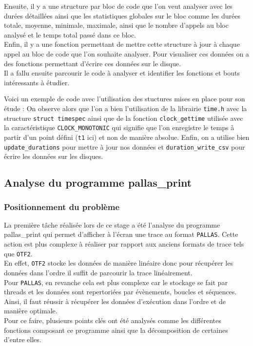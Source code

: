Ensuite, il y a une structure par bloc de code que l'on veut analyser avec les durées détaillées ainsi que les statistiques globales sur le bloc comme les durées totale, moyenne, minimale, maximale, ainsi que 
le nombre d'appels au bloc analysé et le temps total passé dans ce bloc.\\

Enfin, il y a une fonction permettant de mettre cette structure à jour à chaque appel au bloc de code que l'on souhaite analyser.\newline
Pour visualiser ces données on a des fonctions permettant d'écrire ces données sur le disque.\\

Il a fallu ensuite parcourir le code à analyser et identifier les fonctions et bouts intéressants à étudier.

Voici un exemple de code avec l'utilisation des stuctures mises en place pour son étude :
On observe alors que l'on a bien l'utilisation de la librairie \verb!time.h! avec la structure \verb!struct timespec! ainsi que de la fonction \verb!clock_gettime! utilisée
avec la caractéristique \verb!CLOCK_MONOTONIC! qui signifie que l'on enregistre le temps à partir d'un point défini (\verb!t1! ici) et non de manière absolue. Enfin, on a utilise bien
\verb!update_durations! pour mettre à jour nos données et \verb!duration_write_csv! pour écrire les données sur les disques.

\subsection{Analyse du programme pallas\_print}\label{ssec:pallas_print}
\subsubsection{Positionnement du problème}\label{ssec:pallas_print_pbm}

La première tâche réalisée lors de ce stage a été l'analyse du programme pallas\_print qui permet d'afficher à l'écran une trace au format \verb!PALLAS!.
Cette action est plus complexe à réaliser par rapport aux anciens formats de trace tels que \verb!OTF2!.\\
En effet, \verb!OTF2! stocke les données de manière linéaire donc pour récupérer les données dans l'ordre il suffit de parcourir la trace linéairement.\\
Pour \verb!PALLAS!, en revanche cela est plus complexe car le stockage se fait par threads et les données sont repertoriées par évènements, boucles et séquences. Ainsi, il faut réussir 
à récupérer les données d'exécution dans l'ordre et de manière optimale.\\
Pour ce faire, plusieurs points clés ont été analysés comme les différentes fonctions composant ce programme ainsi que la décomposition de certaines d'entre elles.

